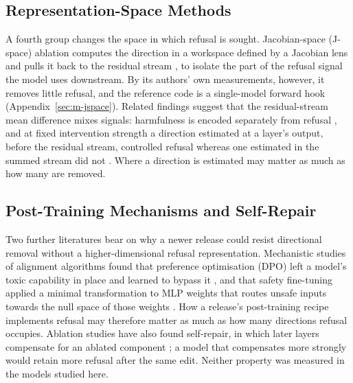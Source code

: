 \subsection{Representation-Space Methods}

A fourth group changes the space in which refusal is sought. Jacobian-space
(J-space) ablation computes the direction in a workspace defined by a Jacobian
lens and pulls it back to the residual stream
\cite{sekinal2026jspace,gurnee2026verbalizable,neuronpedia2026jacobian}, to
isolate the part of the refusal signal the model uses downstream. By its
authors' own measurements, however, it removes little refusal, and the
reference code is a single-model forward hook (Appendix~\ref{sec:m-jspace}). Related findings suggest that the
residual-stream mean difference mixes signals: harmfulness is encoded
separately from refusal \cite{zhao2025harmfulness,yeo2025understanding}, and at
fixed intervention strength a direction estimated at a layer's output, before
the residual stream, controlled refusal whereas one estimated in the summed
stream did not \cite{bosco2026locating}. Where a direction is estimated may
matter as much as how many are removed.

\subsection{Post-Training Mechanisms and Self-Repair}

Two further literatures bear on why a newer release could resist directional
removal without a higher-dimensional refusal representation. Mechanistic
studies of alignment algorithms found that preference optimisation (DPO) left
a model's toxic capability in place and learned to bypass it
\cite{lee2024mechanistic}, and that safety fine-tuning applied a minimal
transformation to MLP weights that routes unsafe inputs towards the null
space of those weights \cite{jain2024makes}. How a release's post-training
recipe implements refusal may therefore matter as much as how many directions
refusal occupies. Ablation studies have also found self-repair, in which later
layers compensate for an ablated component \cite{mcgrath2023hydra}; a model
that compensates more strongly would retain more refusal after the same edit.
Neither property was measured in the models studied here.

